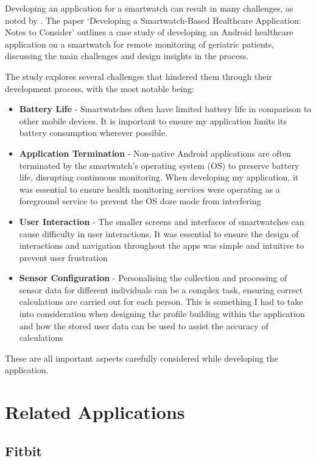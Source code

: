 \documentclass{l4proj}
\begin{document}
Developing an application for a smartwatch can result in many challenges, as noted by \cite{RamezaniDevelopingWatch}. The paper ‘Developing a Smartwatch-Based Healthcare Application: Notes to Consider’ outlines a case study of developing an Android healthcare application on a smartwatch for remote monitoring of geriatric patients, discussing the main challenges and design insights in the process.

The study explores several challenges that hindered them through their development process, with the most notable being:

\begin{itemize}
    \item \textbf{Battery Life} - Smartwatches often have limited battery life in comparison to other mobile devices. It is important to ensure my application limits its battery consumption wherever possible.
    \item \textbf{Application Termination} - Non-native Android applications are often terminated by the smartwatch’s operating system (OS) to preserve battery life, disrupting continuous monitoring. When developing my application, it was essential to ensure health monitoring services were operating as a foreground service to prevent the OS doze mode from interfering
    \item \textbf{User Interaction} - The smaller screens and interfaces of smartwatches can cause difficulty in user interactions. It was essential to ensure the design of interactions and navigation throughout the apps was simple and intuitive to prevent user frustration
    \item \textbf{Sensor Configuration} - Personalising the collection and processing of sensor data for different individuals can be a complex task, ensuring correct calculations are carried out for each person. This is something I had to take into consideration when designing the profile building within the application and how the stored user data can be used to assist the accuracy of calculations
\end{itemize}

These are all important aspects carefully considered while developing the application.

\section{Related Applications}
\label{sec:relatedapps}

\subsection{Fitbit}
\label{sec:fitbit}
\end{document}
